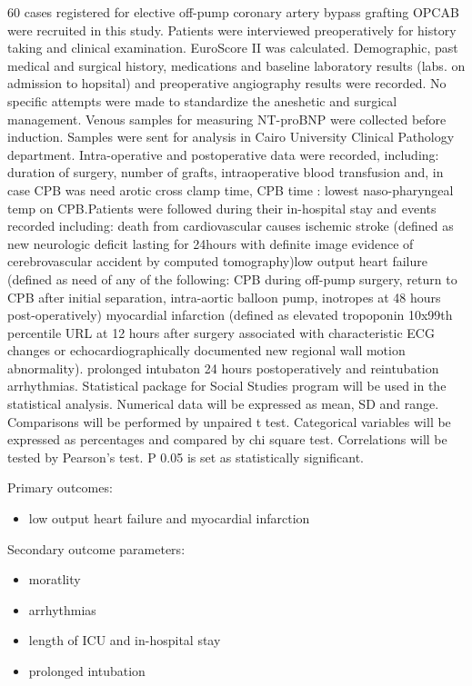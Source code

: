 \documentclass[14pt,a4paper,onecolumn]{article}
\begin{document}
60 cases registered for elective off-pump coronary artery bypass grafting OPCAB were recruited in this study. Patients were interviewed preoperatively for history taking and clinical examination. EuroScore II was calculated. Demographic, past medical and surgical history, medications and baseline laboratory results (labs. on admission to hopsital) and preoperative angiography results were recorded.  No specific attempts were made to standardize the aneshetic and surgical management.  Venous samples for measuring NT-proBNP were collected before induction. Samples were sent for analysis in Cairo University Clinical Pathology department. Intra-operative and postoperative data were recorded, including: duration of surgery, number of grafts, intraoperative blood transfusion and, in case CPB was need arotic cross clamp time, CPB time : lowest naso-pharyngeal temp on CPB.Patients were followed during their in-hospital stay and events recorded including: death from cardiovascular causes ischemic stroke (defined as new neurologic deficit lasting for  24hours with definite image evidence of cerebrovascular accident by computed tomography)low output heart failure (defined as need of any of the following: CPB during off-pump surgery, return to CPB after initial separation, intra-aortic balloon pump, inotropes at 48 hours post-operatively) myocardial infarction (defined as elevated tropoponin 10x99th percentile URL at 12 hours after surgery associated with characteristic ECG changes or echocardiographically documented new regional wall motion abnormality). prolonged intubaton  24 hours postoperatively and reintubation arrhythmias.  Statistical package for Social Studies program will be used in the statistical analysis. Numerical data will be expressed as mean, SD and range. Comparisons will be performed by unpaired t test. Categorical variables will be expressed as percentages and compared by chi square test. Correlations will be tested by Pearson's test. P  0.05 is set as statistically significant.

Primary outcomes:
    \begin{itemize}
        \item low output heart failure and myocardial infarction
    \end{itemize}

Secondary outcome parameters:
    \begin{itemize}
        \item moratlity
        \item arrhythmias
        \item length of ICU and in-hospital stay
        \item prolonged intubation
    \end{itemize}
\end{document}
